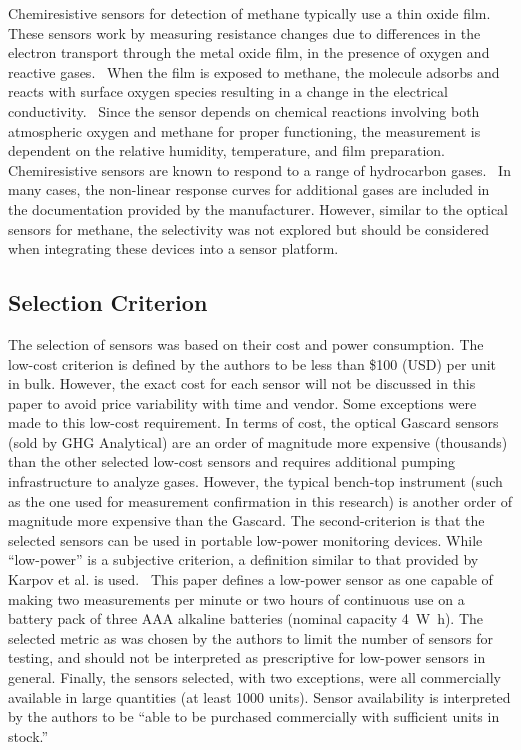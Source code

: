 \documentclass[times]{joehreview}
\begin{document}
	Chemiresistive sensors for detection of methane typically use a thin oxide film.~\cite{neri_first_2015}  These sensors work by measuring resistance changes due to differences in the electron transport through the metal oxide film, in the presence of oxygen and reactive gases.~\cite{albert_cross-reactive_2000}  When the film is exposed to methane, the molecule adsorbs and reacts with surface oxygen species resulting in a change in the electrical conductivity.~\cite{wang_metal_2010,prudenziati_thick-film_1986}  Since the sensor depends on chemical reactions involving both atmospheric oxygen and methane for proper functioning, the measurement is dependent on the relative humidity, temperature, and film preparation.  Chemiresistive sensors are known to respond to a range of hydrocarbon gases.~\cite{sekhar_development_2016} In many cases, the non-linear response curves for additional gases are included in the documentation provided by the manufacturer.  However, similar to the optical sensors for methane, the selectivity was not explored but should be considered when integrating these devices into a sensor platform.
	
	\subsection*{Selection Criterion}
	\label{sec:methods_criterion}
	
	The selection of sensors was based on their cost and power consumption.  The low-cost criterion is defined by the authors to be less than \$100 (USD) per unit in bulk.  However, the exact cost for each sensor will not be discussed in this paper to avoid price variability with time and vendor.  Some exceptions were made to this low-cost requirement. In terms of cost, the optical Gascard sensors (sold by GHG Analytical) are an order of magnitude more expensive (thousands) than the other selected low-cost sensors and requires additional pumping infrastructure to analyze gases.  However, the typical bench-top instrument (such as the one used for measurement confirmation in this research) is another order of magnitude more expensive than the Gascard.  The second-criterion is that the selected sensors can be used in portable low-power monitoring devices.  While ``low-power'' is a subjective criterion, a definition similar to that provided by Karpov et al. is used.~\cite{karpov_energy_2013}  This paper defines a low-power sensor as one capable of making two measurements per minute or two hours of continuous use on a battery pack of three AAA alkaline batteries (nominal capacity \SI{4}{\watt\hour}).  The selected metric as was chosen by the authors to limit the number of sensors for testing, and should not be interpreted as prescriptive for low-power sensors in general.  Finally, the sensors selected, with two exceptions, were all commercially available in large quantities (at least 1000 units).  Sensor availability is interpreted by the authors to be ``able to be purchased commercially with sufficient units in stock.''  
	
\end{document}

